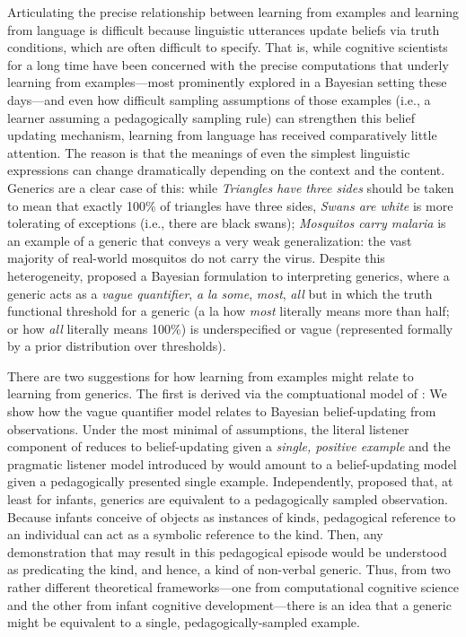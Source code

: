 \documentclass[10pt,letterpaper]{article}
\begin{document}
Articulating the precise relationship between learning from examples and learning from language is difficult because linguistic utterances update beliefs via truth conditions, which are often difficult to specify. 
That is, while cognitive scientists for a long time have been concerned with the precise computations that underly learning from examples---most prominently explored in a Bayesian setting these days---and even how difficult sampling assumptions of those examples (i.e., a learner assuming a pedagogically sampling rule) can strengthen this belief updating mechanism, learning from language has received comparatively little attention. 
The reason is that the meanings of even the simplest linguistic expressions can change dramatically depending on the context and the content. 
Generics are a clear case of this:  while \emph{Triangles have three sides} should be taken to mean that exactly 100\% of triangles have three sides, \emph{Swans are white} is more tolerating of exceptions (i.e., there are black swans); \emph{Mosquitos carry malaria} is an example of a generic that conveys a very weak generalization: the vast majority of real-world mosquitos do not carry the virus. 
Despite this heterogeneity, \cite{Tessler2019psychrev} proposed a Bayesian formulation to interpreting generics, where a generic acts as a \emph{vague quantifier}, \emph{a la} \emph{some}, \emph{most}, \emph{all} but in which the truth functional threshold for a generic (a la how \emph{most} literally means more than half; or how \emph{all} literally means 100\%) is underspecified or vague (represented formally by a prior distribution over thresholds). 

There are two suggestions for how learning from examples might relate to learning from generics.
The first is derived via the comptuational model of \cite{Tessler2019psychrev}: We show how the vague quantifier model relates to Bayesian belief-updating from observations. 
Under the most minimal of assumptions, the literal listener component of   \cite{Tessler2019psychrev}reduces to belief-updating given a \emph{single, positive example} and the pragmatic listener model introduced by  \cite{Tessler2020genint} would amount to a belief-updating model given a pedagogically presented single example.
Independently,  proposed that, at least for infants, generics are equivalent to a pedagogically sampled observation. Because infants conceive of objects as instances of kinds, pedagogical reference to an individual can act as a symbolic reference to the kind. Then, any demonstration that may result in this pedagogical episode would be understood as predicating the kind, and hence, a kind of non-verbal generic.
Thus, from two rather different theoretical frameworks---one from computational cognitive science and the other from infant cognitive development---there is an idea that a generic might be equivalent to a single, pedagogically-sampled example. 
\end{document}
